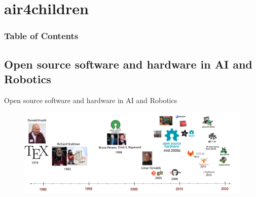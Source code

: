 \section{air4children}


\begin{frame}
      \frametitle{Table of Contents}
      \tableofcontents[currentsection]
\end{frame}


\subsection{Open source software and hardware in AI and Robotics}

{
\begin{frame}{Open source software and hardware in AI and Robotics}

      \begin{figure}
        \centering
        \includegraphics[width=1.0\textwidth]{./figures/timeline-osh/outputs/drawing-v00.png}
      \end{figure}
\end{frame}
}

